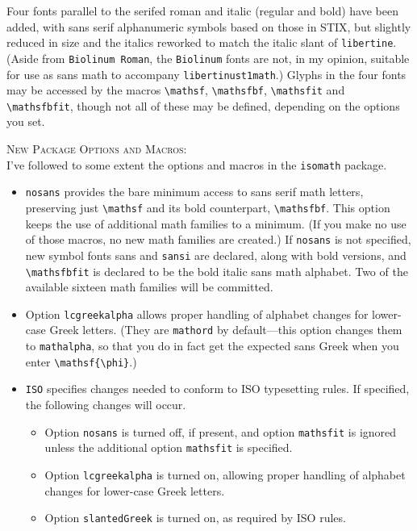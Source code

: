 \documentclass{article}
\begin{document}
Four fonts parallel to the serifed roman and italic (regular and bold) have been added, with sans serif alphanumeric symbols based on those in STIX, but slightly reduced in size and the italics reworked to match the italic slant of {\tt libertine}. (Aside from {\tt Biolinum Roman}, the {\tt Biolinum} fonts are not, in my opinion, suitable for use as sans math to accompany {\tt libertinust1math}.) Glyphs in the four fonts may be accessed by the macros \verb|\mathsf|, \verb|\mathsfbf|, \verb|\mathsfit| and \verb|\mathsfbfit|, though not all of these may be defined, depending on the options you set.

\textsc{New Package Options and Macros:}\\
I've followed to some extent the options and macros in the {\tt isomath} package.
\begin{itemize}
\item
{\tt nosans} provides the bare minimum access to sans serif math letters, preserving just  \verb|\mathsf| and its bold counterpart, \verb|\mathsfbf|. This option keeps the use of additional math families to a minimum.  (If you make no use of those macros, no new math families are created.) If {\tt nosans} is not specified, new symbol fonts {sans} and {\tt sansi} are declared, along with bold versions, and \verb|\mathsfbfit| is declared to be the bold italic sans math alphabet. Two of the available sixteen math families will be committed.
\item Option {\tt lcgreekalpha}  allows proper handling of alphabet changes for lower-case Greek letters. (They are {\tt mathord} by default---this option changes them to {\tt mathalpha}, so that you do in fact get the expected sans Greek when you enter \verb|\mathsf{\phi}|.)
\item {\tt ISO} specifies changes needed to conform to ISO typesetting rules. If specified, the following changes will occur.
\begin{itemize}
\item Option {\tt nosans} is turned off, if present, and option {\tt mathsfit} is ignored unless the additional option {\tt mathsfit} is specified.
\item Option {\tt lcgreekalpha} is turned on, allowing proper handling of alphabet changes for lower-case Greek letters.  
\item Option {\tt slantedGreek} is turned on, as required by ISO rules.


\end{itemize}
\end{itemize}
\end{document}
